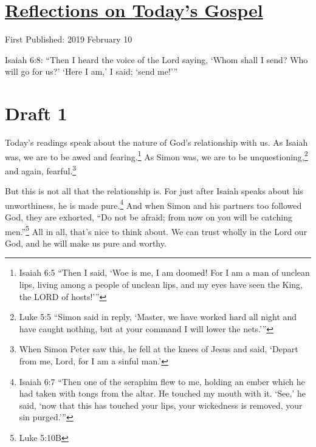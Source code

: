 \documentclass[12pt]{article}[titlepage]
\newcommand{\say}[1]{``#1''}
\newcommand{\nsay}[1]{`#1'}
\newcommand{\1}{\={a}}
\newcommand{\2}{\={e}}
\newcommand{\3}{\={\i}}
\newcommand{\4}{\=o}
\newcommand{\5}{\=u}
\newcommand{\6}{\={A}}
\renewcommand{\,}{\textsuperscript{,}}
\begin{document}
\doublespacing
\section{\href{reflections-on-readings-5-ordinary-c.html}{Reflections on Today's Gospel}}
First Published: 2019 February 10

Isaiah 6:8: \say{Then I heard the voice of the Lord saying, \nsay{Whom shall I send? Who will go for us?} \nsay{Here I am,} I said; \nsay{send me!}}

\section{Draft 1}
Today's readings speak about the nature of God's relationship with us.
As Isaiah was, we are to be awed and fearing.\footnote{Isaiah 6:5 \say{Then I said, \nsay{Woe is me, I am doomed! For I am a man of unclean lips, living among a people of unclean lips, and my eyes have seen the King, the LORD of hosts!}}}
As Simon was, we are to be unquestioning,\footnote{Luke 5:5 \say{Simon said in reply, \nsay{Master, we have worked hard all night and have caught nothing, but at your command I will lower the nets.}}} and again, fearful.\footnote{When Simon Peter saw this, he fell at the knees of Jesus and said, \nsay{Depart from me, Lord, for I am a sinful man.}}

But this is not all that the relationship is.
For just after Isaiah speaks about his unworthiness, he is made pure.\footnote{Isaiah 6:7 \say{Then one of the seraphim flew to me, holding an ember which he had taken with tongs from the altar. He touched my mouth with it. \nsay{See,} he said, \nsay{now that this has touched your lips, your wickedness is removed, your sin purged.}}}
And when Simon and his partners too followed God, they are exhorted, \say{Do not be afraid; from now on you will be catching men.}\footnote{Luke 5:10B}
All in all, that's nice to think about.
We can trust wholly in the Lord our God, and he will make us pure and worthy.
\end{document}
